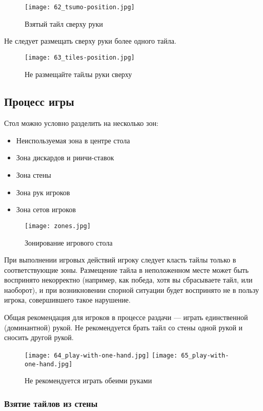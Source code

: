 \begin{figure}[H]
	\centering
	\texttt{[image: 62\_tsumo-position.jpg]}
	\caption{Взятый тайл сверху руки}
\end{figure}

Не следует размещать сверху руки более одного тайла.

\begin{figure}[H]
	\centering
	\texttt{[image: 63\_tiles-position.jpg]}
	\caption{Не размещайте тайлы руки сверху}
\end{figure}

\subsection{Процесс игры}

Стол можно условно разделить на несколько зон:
\begin{itemize}
	\item Неиспользуемая зона в центре стола
	\item Зона дискардов и риичи-ставок
	\item Зона стены
	\item Зона рук игроков
	\item Зона сетов игроков
\end{itemize}

\begin{figure}[H]
	\centering
	\texttt{[image: zones.jpg]}
	\caption{Зонирование игрового стола}
\end{figure}

При выполнении игровых действий игроку следует класть тайлы только в соответствующие зоны. Размещение тайла в неположенном месте может быть воспринято некорректно (например, как победа, хотя вы сбрасываете тайл, или наоборот), и при возникновении спорной ситуации будет воспринято не в пользу игрока, совершившего такое нарушение.

Общая рекомендация для игроков в процессе раздачи --- играть единственной (доминантной) рукой. Не рекомендуется брать тайл со стены одной рукой и сносить другой рукой.

\begin{figure}[H]
	\centering
	\texttt{[image: 64\_play-with-one-hand.jpg]}
	\texttt{[image: 65\_play-with-one-hand.jpg]}
	\caption{Не рекомендуется играть обеими руками}
\end{figure}

\subsubsection{Взятие тайлов из стены}

